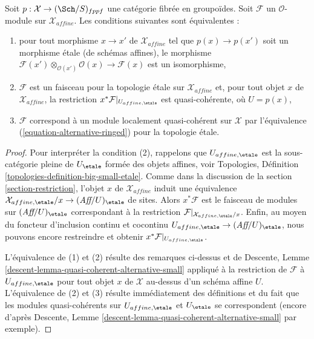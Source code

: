 \begin{lemma}
\label{lemma-locally-quasi-coherent-alternative}
Soit $p : \mathcal{X} \to (\Sch/S)_{fppf}$ une catégorie fibrée en groupoïdes.
Soit $\mathcal{F}$ un $\mathcal{O}$-module sur $\mathcal{X}_{affine}$.
Les conditions suivantes sont équivalentes :
\begin{enumerate}
\item pour tout morphisme $x \to x'$ de $\mathcal{X}_{affine}$ tel que
$p(x) \to p(x')$ soit un morphisme \'etale (de schémas affines), le morphisme
$\mathcal{F}(x') \otimes_{\mathcal{O}(x')} \mathcal{O}(x) \to \mathcal{F}(x)$
est un isomorphisme,
\item $\mathcal{F}$ est un faisceau pour la topologie \'etale sur
$\mathcal{X}_{affine}$ et, pour tout objet $x$ de $\mathcal{X}_{affine}$,
la restriction $x^*\mathcal{F}|_{U_{affine, \etale}}$ est quasi-cohérente,
où $U = p(x)$,
\item $\mathcal{F}$ correspond à un module localement quasi-cohérent
sur $\mathcal{X}$ par l'équivalence (\ref{equation-alternative-ringed})
pour la topologie \'etale.
\end{enumerate}
\end{lemma}

\begin{proof}
Pour interpréter la condition (2), rappelons que $U_{affine, \etale}$
est la sous-catégorie pleine de $U_\etale$ formée des objets affines, voir
Topologies, Définition \ref{topologies-definition-big-small-etale}.
Comme dans la discussion de la section \ref{section-restriction},
l'objet $x$ de $\mathcal{X}_{affine}$ induit une équivalence
$\mathcal{X}_{affine, \etale}/x \to (\textit{Aff}/U)_\etale$ de sites.
Alors $x^*\mathcal{F}$ est le faisceau de modules sur $(\textit{Aff}/U)_\etale$
correspondant à la restriction
$\mathcal{F}|_{\mathcal{X}_{affine, \etale}/x}$.
Enfin, au moyen du foncteur d'inclusion continu et cocontinu
$U_{affine, \etale} \to (\textit{Aff}/U)_\etale$, nous pouvons encore
restreindre et obtenir $x^*\mathcal{F}|_{U_{affine, \etale}}$.

\medskip\noindent
L'équivalence de (1) et (2) résulte des remarques ci-dessus et de
Descente, Lemme \ref{descent-lemma-quasi-coherent-alternative-small}
appliqué à la restriction de $\mathcal{F}$ à $U_{affine, \etale}$
pour tout objet $x$ de $\mathcal{X}$ au-dessus d'un schéma affine $U$.
L'équivalence de (2) et (3) résulte immédiatement des définitions
et du fait que les modules quasi-cohérents sur $U_{affine, \etale}$
et $U_\etale$ se correspondent (encore d'après
Descente, Lemme \ref{descent-lemma-quasi-coherent-alternative-small}
par exemple).
\end{proof}














